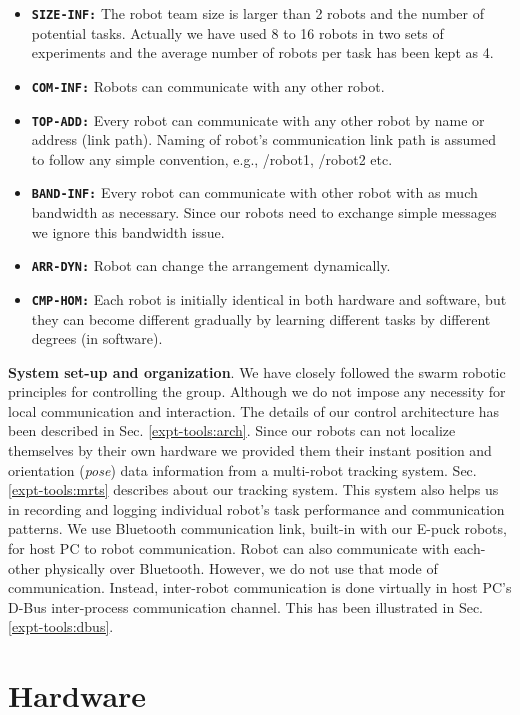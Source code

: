 \begin{itemize}
\item \texttt{\textbf{SIZE-INF:}} The robot team size is larger than 2 robots and the number of potential tasks. Actually we have used  8 to 16 robots in two sets of experiments and  the average number of robots per task has been kept as 4.
\item \texttt{\textbf{COM-INF:}} Robots can communicate with any other robot.
\item \texttt{\textbf{TOP-ADD:}} Every robot can communicate with any other robot by name or address (link path). Naming of robot's communication link path is assumed to follow any simple convention, e.g., /robot1, /robot2 etc.
\item \texttt{\textbf{BAND-INF:}} Every robot can communicate with other robot with as much bandwidth as necessary. Since our robots need to exchange simple messages we ignore this bandwidth issue.
\item \texttt{\textbf{ARR-DYN:}} Robot can change the arrangement dynamically.
\item \texttt{\textbf{CMP-HOM:}} Each robot is initially identical in both hardware and software, but they can become different gradually by learning different tasks by different degrees (in software).
\end{itemize}
\textbf{System set-up and organization}. We have closely followed the swarm robotic principles for controlling the group. Although we do not impose any necessity for local communication and interaction. The details of our control architecture has been described in Sec. \ref{expt-tools:arch}. Since our robots can not localize themselves by their own hardware we provided them their instant position and orientation ({\em pose}) data information from a multi-robot tracking system. Sec. \ref{expt-tools:mrts} describes about our tracking system. This system also helps us in recording and logging individual robot's task performance and communication patterns. We use Bluetooth communication link, built-in with our E-puck robots, for host PC to robot communication. Robot can also communicate with each-other physically over Bluetooth. However, we do not use that mode of communication. Instead, inter-robot communication is done virtually in host PC's D-Bus inter-process communication channel. This has been illustrated in Sec. \ref{expt-tools:dbus}.
\section{Hardware}
